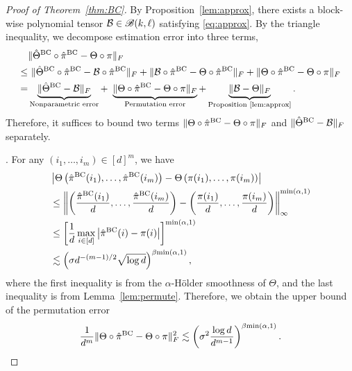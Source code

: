 \documentclass[12pt]{article}
\theoremstyle{definition}
\def\caliB{\mathscr{B}}
\begin{document}
\begin{proof}[Proof of Theorem~\ref{thm:BC}]
By Proposition~\ref{lem:approx}, there exists a block-wise polynomial tensor $\tB\in\caliB(k,\ell)$ satisfying \eqref{eq:approx}.
By the triangle inequality,
we decompose estimation error into three terms,
\begin{align}\label{eq:3decomp}
    &\FnormSize{}{\hat\Theta^{\text{BC}}\circ \hat\pi^{\text{BC}}-\Theta\circ\pi}\notag \\
    \leq&\ \FnormSize{}{\hat\Theta^{\text{BC}}\circ \hat\pi^{\text{BC}}-\tB\circ\hat\pi^{\text{BC}}}+\FnormSize{}{\tB\circ\hat\pi^{\text{BC}}-\Theta\circ\hat\pi^{\text{BC}}}+\FnormSize{}{\Theta\circ\hat\pi^{\text{BC}}-\Theta\circ\pi}\nonumber\\
    =&\underbrace{\FnormSize{}{\hat\Theta^{\text{BC}}-\tB}}_{\textup{Nonparametric error}}+\ \underbrace{\FnormSize{}{\Theta\circ\hat\pi^{\text{BC}}-\Theta\circ\pi}}_{\textup{Permutation error}}+\underbrace{\FnormSize{}{\tB-\Theta}}_{\textup{Proposition~\ref{lem:approx}}}.
\end{align}
Therefore, it suffices to bound two terms $\lVert\Theta\circ\hat\pi^{\text{BC}}-\Theta\circ\pi\rVert_F$ and $\lVert\hat\Theta^{\text{BC}}-\mathcal{B}\rVert_F$ separately. 

.
    For any $(i_1,\ldots,i_m)\in[d]^m$, we have 
    \begin{align}
        &\left|\Theta\left(\hat\pi^{\textup{BC}}(i_1),\ldots,\hat\pi^{\textup{BC}}(i_m)\right)-\Theta\left(\pi(i_1),\ldots,\pi(i_m)\right)\right|\\&\leq \left\|\left(\frac{\hat\pi^{\textup{BC}}(i_1)}{d},\ldots,\frac{\hat\pi^{\textup{BC}}(i_m)}{d}\right)-\left(\frac{\pi(i_1)}{d},\ldots,\frac{\pi(i_m)}{d}\right)\right\|_\infty^{\min(\alpha,1)}\\&\leq \left[\frac{1}{d}\max_{i\in[d]}\left|\hat\pi^{\textup{BC}}(i)-\pi(i)\right|\right]^{\min(\alpha,1)}\\&\lesssim \left(\sigma d^{-(m-1)/2}\sqrt{\log d}\right)^{\beta{\min(\alpha,1)}},
    \end{align}
    where the first inequality is from the $\alpha$-H\"older smoothness of $\Theta$, and the last inequality is from Lemma~\ref{lem:permute}. Therefore, we obtain the upper bound of the permutation error 
    \begin{align}\label{eq:permerror}
        \frac{1}{d^m}\lVert\Theta\circ\hat\pi^{\text{BC}}-\Theta\circ\pi\rVert_F^2\lesssim \left(\sigma^2 \frac{\log d}{d^{m-1}}\right)^{\beta{\min(\alpha,1)}}.
    \end{align}
    

\end{proof}
\end{document}
